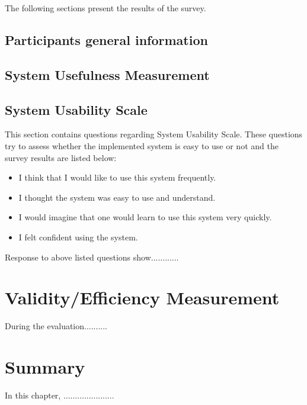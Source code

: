 The following sections present the results of the survey.


\subsection{Participants general information}

\subsection{System Usefulness Measurement}


\subsection{System Usability Scale}
This section contains questions regarding System Usability Scale. These questions try to assess whether the implemented system is easy to use or not and the survey results are listed below:

\begin{itemize}
\item I think that I would like to use this system frequently.
\item I thought the system was easy to use and understand.
\item I would imagine that one would learn to use this system very quickly.
\item I felt confident using the system.
\end{itemize}

Response to above listed questions show............


\section{Validity/Efficiency Measurement}

During the evaluation..........


\section{Summary}
In this chapter, ......................
